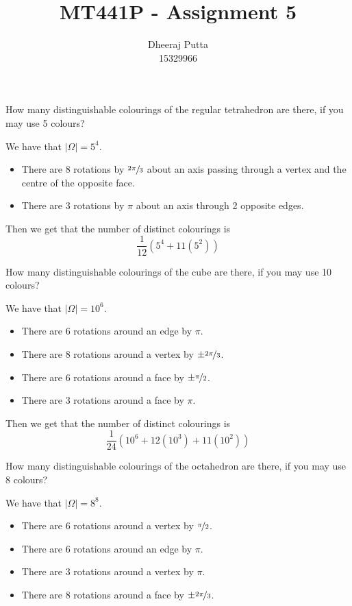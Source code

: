 \documentclass[12pt, answers]{exam}
\title{MT441P - Assignment 5}
\author{Dheeraj Putta \\ 15329966}
\date{}
\begin{document}
    \maketitle
    \begin{questions}
        \thispagestyle{foot}
        \question  How many distinguishable colourings of the regular tetrahedron are
        there, if you may use 5 colours?

        \begin{solution}
            We have that $|\Omega| = 5^4$.
            \begin{itemize}
                \item There are 8 rotations by $\sfrac{2\pi}{3}$ about an axis passing through a vertex and the centre of
                      the opposite face.
                \item There are 3 rotations by $\pi$ about an axis through 2 opposite edges.
            \end{itemize}
            Then we get that the number of distinct colourings is
            \[ \frac{1}{12}\left(5^4 + 11\left(5^2\right)\right) \]
        \end{solution}

        \question  How many distinguishable colourings of the cube are there, if you may
        use 10 colours?

        \begin{solution}
            We have that $|\Omega| = 10 ^6$.
            \begin{itemize}
                \item There are 6 rotations around an edge by $\pi$.
                \item There are 8 rotations around a vertex by $\pm \nicefrac{2\pi}{3}$.
                \item There are 6 rotations around a face by $\pm \nicefrac{\pi}{2}$.
                \item There are 3 rotations around a face by $\pi$.
            \end{itemize}
            Then we get that the number of distinct colourings is
            \[ \frac{1}{24}\left(10^6 + 12\left(10^3\right) + 11 \left(10^2\right)\right) \]
        \end{solution}

        \question How many distinguishable colourings of the octahedron are there, if you
        may use 8 colours?

        \begin{solution}
            We have that $|\Omega| = 8^8$.
            \begin{itemize}
                \item There are 6 rotations around a vertex by $\nicefrac{\pi}{2}$.
                \item There are 6 rotations around an edge by $\pi$.
                \item There are 3 rotations around a vertex by $\pi$.
                \item There are 8 rotations around a face by $\pm \nicefrac{2\pi}{3}$.
            \end{itemize}


\end{solution}
\end{questions}
\end{document}
